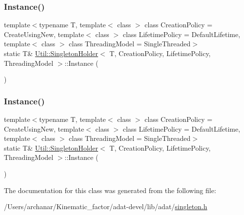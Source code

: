 \subsubsection{\texorpdfstring{Instance()}{Instance()}\hspace{0.1cm}{\footnotesize\ttfamily [2/3]}}
{\footnotesize\ttfamily template$<$typename T, template$<$ class $>$ class Creation\+Policy = Create\+Using\+New, template$<$ class $>$ class Lifetime\+Policy = Default\+Lifetime, template$<$ class $>$ class Threading\+Model = Single\+Threaded$>$ \\
static T\& \mbox{\hyperlink{classUtil_1_1SingletonHolder}{Util\+::\+Singleton\+Holder}}$<$ T, Creation\+Policy, Lifetime\+Policy, Threading\+Model $>$\+::Instance (\begin{DoxyParamCaption}{ }\end{DoxyParamCaption})\hspace{0.3cm}{\ttfamily [static]}}

\mbox{\label{classUtil_1_1SingletonHolder_ab7cd7d81731ce5e022f12724dad02230}} 
\subsubsection{\texorpdfstring{Instance()}{Instance()}\hspace{0.1cm}{\footnotesize\ttfamily [3/3]}}
{\footnotesize\ttfamily template$<$typename T, template$<$ class $>$ class Creation\+Policy = Create\+Using\+New, template$<$ class $>$ class Lifetime\+Policy = Default\+Lifetime, template$<$ class $>$ class Threading\+Model = Single\+Threaded$>$ \\
static T\& \mbox{\hyperlink{classUtil_1_1SingletonHolder}{Util\+::\+Singleton\+Holder}}$<$ T, Creation\+Policy, Lifetime\+Policy, Threading\+Model $>$\+::Instance (\begin{DoxyParamCaption}{ }\end{DoxyParamCaption})\hspace{0.3cm}{\ttfamily [static]}}



The documentation for this class was generated from the following file\+:\begin{DoxyCompactItemize}
\item 
/\+Users/archanar/\+Kinematic\+\_\+factor/adat-\/devel/lib/adat/\mbox{\hyperlink{adat-devel_2lib_2adat_2singleton_8h}{singleton.\+h}}\end{DoxyCompactItemize}
